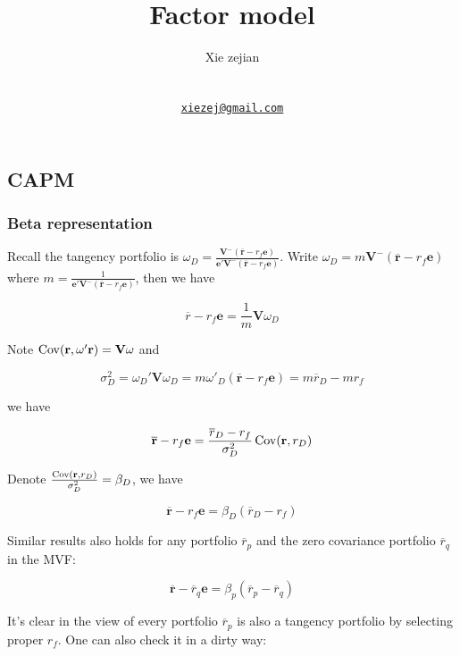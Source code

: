 \documentclass{article}
\title{Factor model}
\author{
    Xie zejian
   \\
     \\
   \\
  \texttt{\href{mailto:xiezej@gmail.com}{\nolinkurl{xiezej@gmail.com}}} \\
  }
\begin{document}
\maketitle

\def\tightlist{}


\begin{abstract}

\end{abstract}


\hypertarget{capm}{%
\subsection{CAPM}\label{capm}}

\hypertarget{beta-representation}{%
\subsubsection{Beta representation}\label{beta-representation}}

Recall the tangency portfolio is
\(\omega_D=\frac{\mathbf{V^-}(\overline{\mathbf{r}}-r_f\mathbf{e})}{\mathbf{e'V^-}(\overline{\mathbf{r}}-r_f\mathbf{e})}\).
Write \(\omega_D=m \mathbf{V^-} (\overline{\mathbf{r}}-r_f\mathbf{e})\)
where
\(m=\frac{1}{\mathbf{e'}\mathbf{V^-} (\overline{\mathbf{r}}-r_f\mathbf{e})}\),
then we have

\[ \overline{r}-r_f\mathbf{e}=\frac{1}{m}\mathbf{V}\omega_D \]

Note \(\operatorname{Cov}(\mathbf{r},\omega'\mathbf{r})=\mathbf{V\omega}\) and

\[ \sigma_D^2=\omega_D'\mathbf{V}\omega_D=m\omega'_D(\overline{\mathbf{r}}-r_f\mathbf{e})= m\overline{r}_D-mr_f \]

we have

\[ \overline{\mathbf{r}}-r_f\mathbf{e}=\frac{\overline{r}_D-r_f}{\sigma_D^2}\operatorname{Cov}(\mathbf{r},{r_D}) \]

Denote \(\frac{\operatorname{Cov}(\mathbf{r},r_D)}{\sigma_D^2}=\beta_D\), we have

\[ \overline{\mathbf{r}}-r_f\mathbf{e}=\beta_D({\overline{r}_D-r_f}) \]

Similar results also holds for any portfolio \(\overline{r}_p\) and the
zero covariance portfolio \(\overline{r}_q\) in the MVF:

\[ \overline{\mathbf{r}}-\overline{r}_q\mathbf{e}=\beta_p(\overline{r}_p-\overline{r}_q) \]

It's clear in the view of every portfolio \(\overline{r}_p\) is also a
tangency portfolio by selecting proper \(r_f\). One can also check it in
a dirty way:
\end{document}
